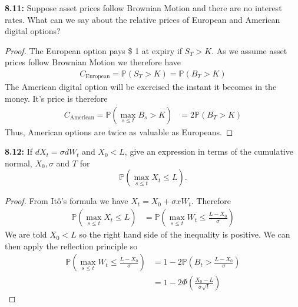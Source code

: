\begin{tcolorbox}[colframe=black,colback=gray!5,boxrule=0.5pt]
\textbf{8.11:} Suppose asset prices follow Brownian Motion and there are no interest rates. What can we say about the relative prices of European and American digital options? 
\end{tcolorbox}
\begin{proof}
    The European option pays \$ 1 at expiry if $S_T>K$. As we assume asset prices follow Brownian Motion we therefore have
    \begin{align*}
        C_{\text{European}} = \mathbb{P}(S_T>K) = \mathbb{P}(B_T>K)
    \end{align*}
    The American digital option will be exercised the instant it becomes in the money. It's price is therefore 
    \begin{align*}
        C_{\text{American}} = \mathbb{P}\left(\max_{s\leq t}B_s > K\right) &= 2\mathbb{P}(B_T>K)
    \end{align*}
    Thus, American options are twice as valuable as Europeans.
\end{proof}

\begin{tcolorbox}[colframe=black,colback=gray!5,boxrule=0.5pt]
\textbf{8.12:} If $dX_t = \sigma dW_t$ and $X_0 < L$, give an expression in terms of the cumulative normal, $X_0, \sigma$ and $T$ for 
$$\mathbb{P}\left(\max_{s\leq t} X_t\leq L\right).$$
\end{tcolorbox}
\begin{proof} From Itô's formula we have $X_t = X_0 + \sigma xW_t$. Therefore 
\begin{align*}
    \mathbb{P}\left(\max_{s\leq t} X_t\leq L\right) &= \mathbb{P}\left(\max_{s\leq t} W_t\leq \frac{L-X_0}{\sigma}\right)
\end{align*}
    We are told $X_0 < L$ so the right hand side of the inequality is positive. We can then apply the reflection principle so 
\begin{align*}
    \mathbb{P}\left(\max_{s\leq t} W_t\leq \frac{L-X_0}{\sigma}\right) &= 1-2\mathbb{P}\left(B_t>\frac{L-X_0}{\sigma}\right) \\
    &=1 - 2\Phi\left(\frac{X_0-L}{\sigma\sqrt{t}}\right)
\end{align*}
\end{proof}
